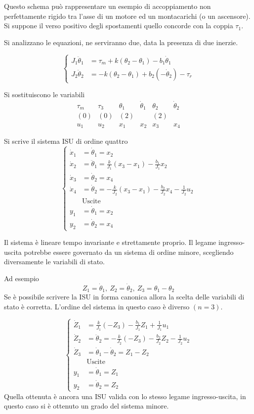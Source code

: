 Questo schema può rappresentare un esempio di accoppiamento non perfettamente
rigido tra l'asse di un motore ed un montacarichi (o un ascensore).
Si suppone il verso positivo degli spostamenti quello concorde con la coppia
$\tau_1$.

Si analizzano le equazioni, ne serviranno due, data la presenza di due inerzie.

$$\left\{\begin{aligned}
J_1 \ddot{\theta}_1 &= \tau_m + k(\theta_2 -\theta_1) - b_1\dot{\theta}_1 \\
J_2 \ddot{\theta}_2 &= -k(\theta_2-\theta_1) +b_2(-\dot{\theta}_2) - \tau_r
\end{aligned}\right.$$

Si sostituiscono le variabili
$$\begin{matrix}
\tau_m & \tau_3 & \theta_1 & \dot{\theta}_1 & \theta_2 & \dot{\theta}_2\\
(0) & (0) &       (2)  &      &  (2)  \\
  u_1  &  u_2  & x_1 & x_2 & x_3 & x_4
\end{matrix}$$

Si scrive il sistema ISU di ordine quattro
$$\left\{
\begin{aligned}
 \dot{x}_1 & = \dot{\theta}_1 = x_2 \\
 \dot{x}_2 &= \ddot{\theta}_1 = \frac{k}{J_1} (x_3 - x_1) - \frac{b_1}{J_1}
x_2\\
\dot{x}_3 &= \dot{\theta}_2 = x_4 \\
\dot{x}_4 &= \dot{\theta}_2 = -\frac{k}{J_2}(x_3-x_1) - \frac{b_2}{J_2}x_4 -
\frac{1}{J_2}u_2\\
&\text{Uscite}\\
y_1 &= \dot\theta_1 = x_2 \\
y_2 &= \dot\theta_2 = x_4
\end{aligned}
\right.$$

Il sistema è lineare tempo invariante e strettamente proprio.
Il legame ingresso-uscita potrebbe essere governato da un sistema di ordine
minore, scegliendo diversamente le variabili di stato.

Ad esempio
$$
Z_1 = \dot\theta_1,\ Z_2 = \dot\theta_2,\ Z_3 = \theta_1 - \theta_2
$$
Se è possibile scrivere la ISU in forma canonica allora la scelta delle
variabili di stato è corretta.
L'ordine del sistema in questo caso è diverso $(n=3)$.

$$\left\{\begin{aligned}
\dot Z_1 &= \frac{k}{J_1}(-Z_3) - \frac{b_1}{J_1}Z_1 + \frac{1}{J_1}u_1 \\
\dot Z_2 &= \ddot\theta_2 = -\frac{k}{J_2}(-Z_3) - \frac{b_2}{J_2}Z_2 -
\frac{1}{J_2}u_2\\
\dot{Z}_3 &= \dot\theta_1-\dot\theta_2 = Z_1 - Z_2 \\
&\text{Uscite}\\
y_1 &= \dot\theta_1 = Z_1 \\
y_2 &= \dot\theta_2 = Z_2
\end{aligned}\right.$$
Quella ottenuta è ancora una ISU valida con lo stesso legame ingresso-uscita,
in questo caso si è ottenuto un grado del sistema minore.

